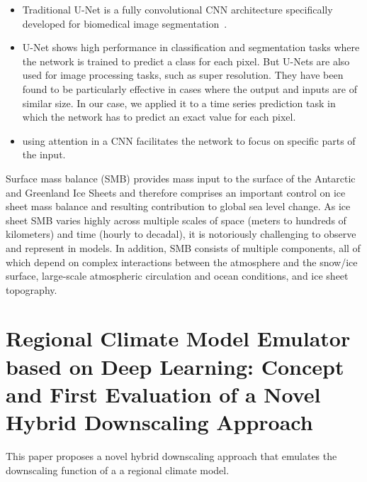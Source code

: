 \documentclass[a4paper,11pt,oneside]{report}
\begin{document}
\begin{itemize}
    \item Traditional U-Net is a fully convolutional CNN architecture specifically developed for biomedical image segmentation~\cite{Ronneberger2015}.  
        \item U-Net shows high performance in classification and segmentation tasks where the network is trained to predict a class for each pixel. But U-Nets are also used for image processing tasks, such as super resolution. They have been found to be particularly effective in cases where the output and inputs are of similar size. In our case, we applied it to a time series prediction task in which the network has to predict an exact value for each pixel.
    \item using attention in a CNN facilitates the network to focus on specific parts of the input. 
\end{itemize}

Surface mass balance (SMB) provides mass input to the surface of the Antarctic and Greenland Ice Sheets and therefore comprises an important control on ice sheet mass balance and resulting contribution to global sea level change. As ice sheet SMB varies highly across multiple scales of space (meters to hundreds of kilometers) and time (hourly to decadal), it is notoriously challenging to observe and represent in models. In addition, SMB consists of multiple components, all of which depend on complex interactions between the atmosphere and the snow/ice surface, large-scale atmospheric circulation and ocean conditions, and ice sheet topography.~\cite{Lenaerts}


\section{Regional Climate Model Emulator based on Deep Learning: Concept and First Evaluation of a Novel Hybrid Downscaling Approach \cite{Doury}}
This paper proposes a novel hybrid downscaling approach that emulates the downscaling function of a a regional climate model.
\end{document}
